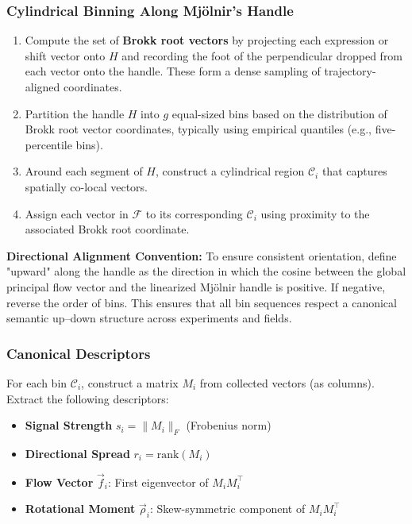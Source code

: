         \subsubsection{Cylindrical Binning Along Mj\"olnir’s Handle}

            \begin{enumerate}
                \item Compute the set of \textbf{Brokk root vectors} by projecting each expression or shift vector onto $H$ and recording the foot of the perpendicular dropped from each vector onto the handle. These form a dense sampling of trajectory-aligned coordinates.
                \item Partition the handle $H$ into $g$ equal-sized bins based on the distribution of Brokk root vector coordinates, typically using empirical quantiles (e.g., five-percentile bins).
                \item Around each segment of $H$, construct a cylindrical region $\mathcal{C}_i$ that captures spatially co-local vectors.
                \item Assign each vector in $\mathcal{F}$ to its corresponding $\mathcal{C}_i$ using proximity to the associated Brokk root coordinate.
            \end{enumerate}

            \textbf{Directional Alignment Convention:} To ensure consistent orientation, define "upward" along the handle as the direction in which the cosine between the global principal flow vector and the linearized Mj\"olnir handle is positive. If negative, reverse the order of bins. This ensures that all bin sequences respect a canonical semantic up–down structure across experiments and fields.

        \subsubsection{Canonical Descriptors}

            For each bin $\mathcal{C}_i$, construct a matrix $M_i$ from collected vectors (as columns). Extract the following descriptors:
            \begin{itemize}
                \item \textbf{Signal Strength} $s_i = \| M_i \|_F$ (Frobenius norm)
                \item \textbf{Directional Spread} $r_i = \mathrm{rank}(M_i)$
                \item \textbf{Flow Vector} $\vec{f}_i$: First eigenvector of $M_i M_i^\top$
                \item \textbf{Rotational Moment} $\vec{\rho}_i$: Skew-symmetric component of $M_i M_i^\top$
            \end{itemize}


